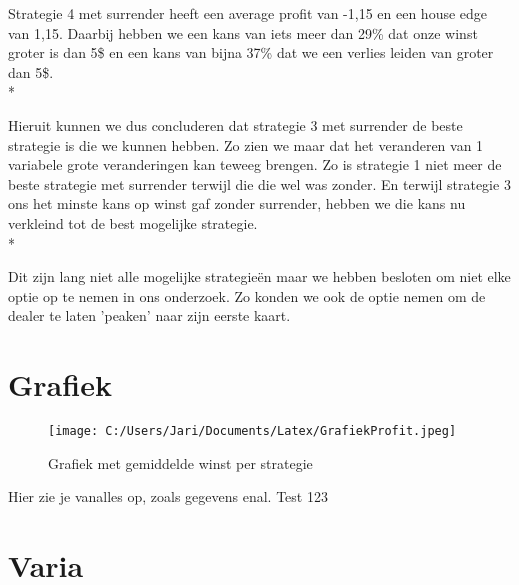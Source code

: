 \documentclass[conference]{IEEEtran}
\begin{document}
Strategie 4 met surrender heeft een average profit van -1,15 en een house edge van 1,15. Daarbij hebben we een kans van iets meer dan 29\% dat onze winst groter is dan 5\$ en een kans van bijna 37\% dat we een verlies leiden van groter dan 5\$. \\*
 
Hieruit kunnen we dus concluderen dat strategie 3 met surrender de beste strategie is die we kunnen hebben. Zo zien we maar dat het veranderen van 1 variabele grote veranderingen kan teweeg brengen. Zo is strategie 1 niet meer de beste strategie met surrender terwijl die die wel was zonder. En terwijl strategie 3 ons het minste kans op winst gaf zonder surrender, hebben we die kans nu verkleind tot de best mogelijke strategie.\\*

Dit zijn lang niet alle mogelijke strategie\"en maar we hebben besloten om niet elke optie op te nemen in ons onderzoek. Zo konden we ook de optie nemen om de dealer te laten 'peaken' naar zijn eerste kaart.

\section{Grafiek}

\begin{figure}[h!]
	\centering
		\texttt{[image: C:/Users/Jari/Documents/Latex/GrafiekProfit.jpeg]}
	\caption{Grafiek met gemiddelde winst per strategie}
	\label{fig:GrafiekProfit}
\end{figure}

Hier zie je vanalles op, zoals gegevens enal.
Test 123

\section{Varia}




\end{document}

